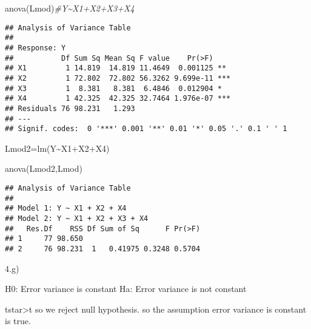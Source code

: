 \documentclass[
]{article}
\newenvironment{Shaded}{\begin{snugshade}}{\end{snugshade}}
\newcommand{\CommentTok}[1]{\textcolor[rgb]{0.56,0.35,0.01}{\textit{#1}}}
\newcommand{\FunctionTok}[1]{\textcolor[rgb]{0.00,0.00,0.00}{#1}}
\newcommand{\NormalTok}[1]{#1}
\newcommand{\OtherTok}[1]{\textcolor[rgb]{0.56,0.35,0.01}{#1}}
\newcommand{\SpecialCharTok}[1]{\textcolor[rgb]{0.00,0.00,0.00}{#1}}
\begin{document}
\begin{Shaded}
\begin{Highlighting}[]
\FunctionTok{anova}\NormalTok{(Lmod)}\CommentTok{\#Y\textasciitilde{}X1+X2+X3+X4}
\end{Highlighting}
\end{Shaded}

\begin{verbatim}
## Analysis of Variance Table
## 
## Response: Y
##           Df Sum Sq Mean Sq F value    Pr(>F)    
## X1         1 14.819  14.819 11.4649  0.001125 ** 
## X2         1 72.802  72.802 56.3262 9.699e-11 ***
## X3         1  8.381   8.381  6.4846  0.012904 *  
## X4         1 42.325  42.325 32.7464 1.976e-07 ***
## Residuals 76 98.231   1.293                      
## ---
## Signif. codes:  0 '***' 0.001 '**' 0.01 '*' 0.05 '.' 0.1 ' ' 1
\end{verbatim}

\begin{Shaded}
\begin{Highlighting}[]
\NormalTok{Lmod2}\OtherTok{=}\FunctionTok{lm}\NormalTok{(Y}\SpecialCharTok{\textasciitilde{}}\NormalTok{X1}\SpecialCharTok{+}\NormalTok{X2}\SpecialCharTok{+}\NormalTok{X4)}

\FunctionTok{anova}\NormalTok{(Lmod2,Lmod)}
\end{Highlighting}
\end{Shaded}

\begin{verbatim}
## Analysis of Variance Table
## 
## Model 1: Y ~ X1 + X2 + X4
## Model 2: Y ~ X1 + X2 + X3 + X4
##   Res.Df    RSS Df Sum of Sq      F Pr(>F)
## 1     77 98.650                           
## 2     76 98.231  1   0.41975 0.3248 0.5704
\end{verbatim}

4.g)

H0: Error variance is constant Ha: Error variance is not constant

tstar\textgreater t so we reject null hypothesis. so the assumption
error variance is constant is true.
\end{document}
